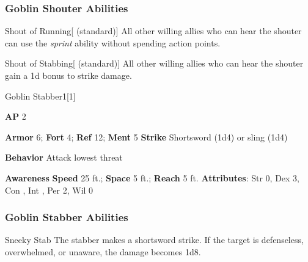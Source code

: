 \subsubsection{Goblin Shouter Abilities}

\begin{ability}{Shout of Running}[ (standard)]
All other willing allies who can hear the shouter can use the \textit{sprint} ability without spending action points.
\end{ability}

\vspace{0.5em}
\begin{ability}{Shout of Stabbing}[ (standard)]
All other willing allies who can hear the shouter gain a \plus1d bonus to strike damage.
\end{ability}

\begin{monsection}{Goblin Stabber}{1}[1]
\vspace{-1em}\vspace{-1em}
\begin{spellcontent}
\begin{spelltargetinginfo}
{\textbf{AP} 2}

\pari \textbf{Armor} 6;
\textbf{Fort} 4;
\textbf{Ref} 12;
\textbf{Ment} 5
\pari \textbf{Strike} Shortsword  (1d4) or sling  (1d4)



\pari \textbf{Behavior} Attack lowest threat
\end{spelltargetinginfo}
\end{spellcontent}

\begin{monsterfooter}
\pari \textbf{Awareness} 
\pari \textbf{Speed} 25 ft.;
\textbf{Space} 5 ft.;
\textbf{Reach} 5 ft.
\pari \textbf{Attributes}:
Str 0,
Dex 3,
Con ,
Int ,
Per 2,
Wil 0
\end{monsterfooter}
\end{monsection}


\subsubsection{Goblin Stabber Abilities}

\begin{ability}{Sneeky Stab}
The stabber makes a shortsword strike.
If the target is defenseless, overwhelmed, or unaware, the damage becomes 1d8.
\end{ability}

